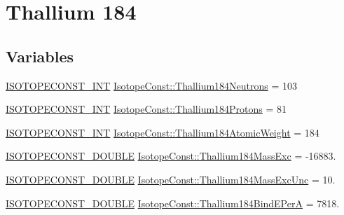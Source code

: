 \hypertarget{group___isotope_const-_thallium-_tl184}{}\section{Thallium 184}
\label{group___isotope_const-_thallium-_tl184}
\subsection*{Variables}
\begin{DoxyCompactItemize}
\item 
\mbox{\hyperlink{group___isotope_const-_macros_ga5f18360b3e99483a35c32d789e62621c}{I\+S\+O\+T\+O\+P\+E\+C\+O\+N\+S\+T\+\_\+\+I\+NT}} \mbox{\hyperlink{group___isotope_const-_thallium-_tl184_gad29ec3772f1b76800bab87df9b18c03f}{Isotope\+Const\+::\+Thallium184\+Neutrons}} = 103
\item 
\mbox{\hyperlink{group___isotope_const-_macros_ga5f18360b3e99483a35c32d789e62621c}{I\+S\+O\+T\+O\+P\+E\+C\+O\+N\+S\+T\+\_\+\+I\+NT}} \mbox{\hyperlink{group___isotope_const-_thallium-_tl184_ga21e4af59f849ff0205ce92f33e2d31d3}{Isotope\+Const\+::\+Thallium184\+Protons}} = 81
\item 
\mbox{\hyperlink{group___isotope_const-_macros_ga5f18360b3e99483a35c32d789e62621c}{I\+S\+O\+T\+O\+P\+E\+C\+O\+N\+S\+T\+\_\+\+I\+NT}} \mbox{\hyperlink{group___isotope_const-_thallium-_tl184_gaea1f33d72f96b48d2d6aa67c52e92e88}{Isotope\+Const\+::\+Thallium184\+Atomic\+Weight}} = 184
\item 
\mbox{\hyperlink{group___isotope_const-_macros_ga8f45a7272ce02c0b4c65c44636ed719a}{I\+S\+O\+T\+O\+P\+E\+C\+O\+N\+S\+T\+\_\+\+D\+O\+U\+B\+LE}} \mbox{\hyperlink{group___isotope_const-_thallium-_tl184_ga93ffb6cf34e464bc13dd956a2915f13c}{Isotope\+Const\+::\+Thallium184\+Mass\+Exc}} = -\/16883.
\item 
\mbox{\hyperlink{group___isotope_const-_macros_ga8f45a7272ce02c0b4c65c44636ed719a}{I\+S\+O\+T\+O\+P\+E\+C\+O\+N\+S\+T\+\_\+\+D\+O\+U\+B\+LE}} \mbox{\hyperlink{group___isotope_const-_thallium-_tl184_gac3a0d51b2926d1bde4a38a052e24c952}{Isotope\+Const\+::\+Thallium184\+Mass\+Exc\+Unc}} = 10.
\item 
\mbox{\hyperlink{group___isotope_const-_macros_ga8f45a7272ce02c0b4c65c44636ed719a}{I\+S\+O\+T\+O\+P\+E\+C\+O\+N\+S\+T\+\_\+\+D\+O\+U\+B\+LE}} \mbox{\hyperlink{group___isotope_const-_thallium-_tl184_ga50777e69a72fd8d2aab103962f7464f6}{Isotope\+Const\+::\+Thallium184\+Bind\+E\+PerA}} = 7818.
\item 

\end{DoxyCompactItemize}
